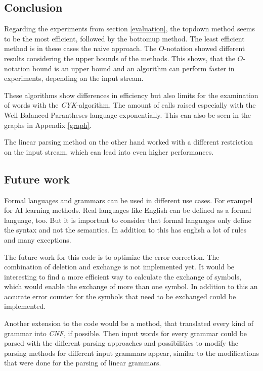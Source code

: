 \documentclass[a4paper, 11pt]{article}
\begin{document}
\subsection{Conclusion}


Regarding the experiments from section \ref{evaluation}, the topdown method seems to be the most efficient, followed by the bottomup method. The least efficient method is in these cases the naive approach. The $O$-notation showed different results considering the upper bounds of the methods. This shows, that the $O$-notation bound is an upper bound and an algorithm can perform faster in experiments, depending on the input stream.


These algorithms show differences in efficiency but also limits for the examination of words with the \textit{CYK}-algorithm. The amount of calls raised especially with the Well-Balanced-Parantheses language exponentially. This can also be seen in the graphs in Appendix \ref{graph}.

The linear parsing method on the other hand worked with a different restriction on the input stream, which can lead into even higher performances.


\subsection{Future work}

Formal languages and grammars can be used in different use cases. For exampel for AI learning methods. Real languages like English can be defined as a formal language, too. But it is important to consider that formal languages only define the syntax and not the semantics. In addition to this has english a lot of rules and many exceptions. \cite{FG}

The future work for this code is to optimize the error correction. The combination of deletion and exchange is not implemented yet. It would be interesting to find a more efficient way to calculate the exchange of symbols, which would enable the exchange of more than one symbol.
In addition to this an accurate error counter for the symbols that need to be exchanged could be implemented.

Another extension to the code would be a method, that translated every kind of grammar into \textit{CNF}, if possible. Then input words for every grammar could be parsed with the different parsing approaches and possibilities to modify the parsing methods for different input grammars appear, similar to the modifications that were done for the parsing of linear grammars.
\end{document}
